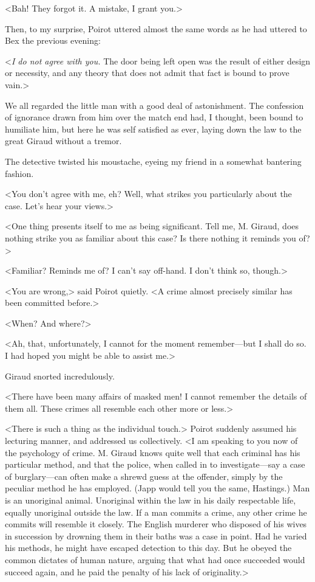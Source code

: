  <Bah! They forgot it. A mistake, I grant you.> 

 Then, to my surprise, Poirot uttered almost the same words as he had uttered to Bex the previous evening: 

 <\emph{I do not agree with you.} The door being left open was the result of either design or necessity, and any theory that does not admit that fact is bound to prove vain.> 

 We all regarded the little man with a good deal of astonishment. The confession of ignorance drawn from him over the match end had, I thought, been bound to humiliate him, but here he was self satisfied as ever, laying down the law to the great Giraud without a tremor. 

 The detective twisted his moustache, eyeing my friend in a somewhat bantering fashion. 

 <You don't agree with me, eh? Well, what strikes you particularly about the case. Let's hear your views.> 

 <One thing presents itself to me as being significant. Tell me, M. Giraud, does nothing strike you as familiar about this case? Is there nothing it reminds you of?> 

 <Familiar? Reminds me of? I can't say off-hand. I don't think so, though.> 

 <You are wrong,> said Poirot quietly. <A crime almost precisely similar has been committed before.> 

 <When? And where?> 

 <Ah, that, unfortunately, I cannot for the moment remember—but I shall do so. I had hoped you might be able to assist me.> 

 Giraud snorted incredulously. 

 <There have been many affairs of masked men! I cannot remember the details of them all. These crimes all resemble each other more or less.> 

 <There is such a thing as the individual touch.> Poirot suddenly assumed his lecturing manner, and addressed us collectively. <I am speaking to you now of the psychology of crime. M. Giraud knows quite well that each criminal has his particular method, and that the police, when called in to investigate—say a case of burglary—can often make a shrewd guess at the offender, simply by the peculiar method he has employed. (Japp would tell you the same, Hastings.) Man is an unoriginal animal. Unoriginal within the law in his daily respectable life, equally unoriginal outside the law. If a man commits a crime, any other crime he commits will resemble it closely. The English murderer who disposed of his wives in succession by drowning them in their baths was a case in point. Had he varied his methods, he might have escaped detection to this day. But he obeyed the common dictates of human nature, arguing that what had once succeeded would succeed again, and he paid the penalty of his lack of originality.> 

